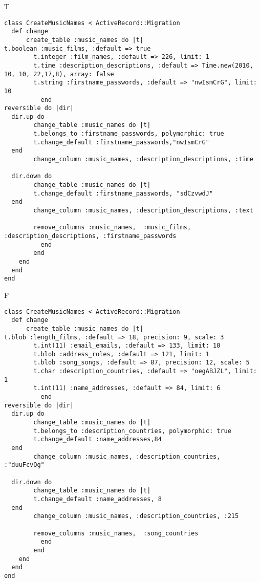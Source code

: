 T
\begin{verbatim}
class CreateMusicNames < ActiveRecord::Migration
  def change
	  create_table :music_names do |t|
t.boolean :music_films, :default => true
		t.integer :film_names, :default => 226, limit: 1
		t.time :description_descriptions, :default => Time.new(2010, 10, 10, 22,17,8), array: false
		t.string :firstname_passwords, :default => "nwIsmCrG", limit: 10
		  end
reversible do |dir|
  dir.up do
		change_table :music_names do |t|
		t.belongs_to :firstname_passwords, polymorphic: true
 		t.change_default :firstname_passwords,"nwIsmCrG"
  end
 		change_column :music_names, :description_descriptions, :time
   
  dir.down do
		change_table :music_names do |t|
		t.change_default :firstname_passwords, "sdCzvwdJ"
  end
 		change_column :music_names, :description_descriptions, :text
   
		remove_columns :music_names,  :music_films, :description_descriptions, :firstname_passwords 
	      end
	    end
    end 
  end
end

\end{verbatim}

F
\begin{verbatim}
class CreateMusicNames < ActiveRecord::Migration
  def change
	  create_table :music_names do |t|
t.blob :length_films, :default => 18, precision: 9, scale: 3
		t.int(11) :email_emails, :default => 133, limit: 10
		t.blob :address_roles, :default => 121, limit: 1
		t.blob :song_songs, :default => 87, precision: 12, scale: 5
		t.char :description_countries, :default => "oegABJZL", limit: 1
		t.int(11) :name_addresses, :default => 84, limit: 6
		  end
reversible do |dir|
  dir.up do
		change_table :music_names do |t|
		t.belongs_to :description_countries, polymorphic: true
 		t.change_default :name_addresses,84
  end
 		change_column :music_names, :description_countries, :"duuFcvQg"
   
  dir.down do
		change_table :music_names do |t|
		t.change_default :name_addresses, 8
  end
 		change_column :music_names, :description_countries, :215
   
		remove_columns :music_names,  :song_countries 
	      end
	    end
    end 
  end
end

\end{verbatim}

